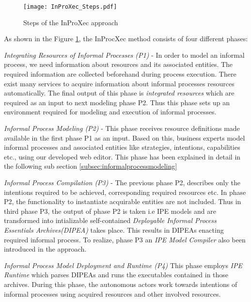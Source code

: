 \begin{figure}
	\centering
	\texttt{[image: InProXec\_Steps.pdf]}
	\caption{Steps of the InProXec approach \cite{Sungur2015}}
	\label{fig:inprocxec_steps}
\end{figure} 

As shown in the Figure \ref{fig:inprocxec_steps}, the InProcXec method consists of four different phases:

\textit{Integrating Resources of Informal Processes (P1)} - In order to model an informal process, we need information about resources and its associated entities. The required information are collected beforehand during process execution. There exist many services to acquire information about informal processes resources automatically. The final output of this phase is \textit{integrated resources} which are required as an input to next modeling phase P2. Thus this phase sets up an environment required for modeling and execution of informal processes.  

\textit{Informal Process Modeling (P2)} - This phase receives resource definitions made available in the first phase P1 as an input.  Based on this, business experts model informal processes and associated entities like strategies, intentions, capabilities etc., using our developed web editor. This phase has been explained in detail in the following sub section \ref{subsec:informalprocessmodeling}    

\textit{Informal Process Compilation (P3)} - The previous phase P2, describes only the intentions required to be achieved, corresponding required resources etc. In phase P2, the functionality to instantiate acquirable entities are not included. Thus in third phase P3, the output of phase P2 is taken i.e IPE models and are transformed into intializable self-contained \textit{Deployable Informal Process Essentials Archives(DIPEA)} \cite{Sungur2015} takes place. This results in DIPEAs enacting required informal process. To realize, phase P3 an \textit{IPE Model Compiler} also been introduced in the approach. 

\textit{Informal Process Model Deployment and Runtime (P4)} This phase employs \textit{IPE Runtime} which parses DIPEAs and runs the executables contained in those archives. During this phase, the autonomous actors work towards intentions of informal processes using acquired resources and other involved resources.  

